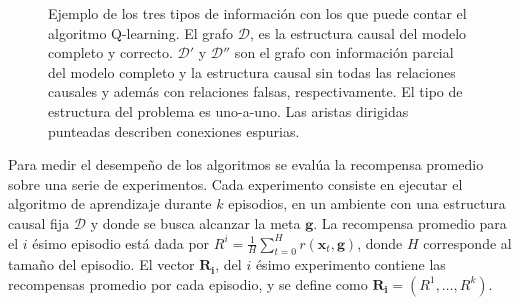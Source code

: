 \begin{figure}
  \centering
  \qquad
    \qquad
  \caption{Ejemplo de los tres tipos de información con los que puede contar el algoritmo Q-learning. El grafo $\mathcal{D}$, es la estructura causal del modelo completo y correcto. $\mathcal{D'}$ y $\mathcal{D''}$ son el grafo con información parcial del modelo completo y la estructura causal sin todas las relaciones causales y además con relaciones falsas, respectivamente. El tipo de estructura
  del problema es uno-a-uno. Las aristas dirigidas punteadas describen conexiones espurias.}
  \label{fig:types-info-dag}
\end{figure}

Para medir el desempeño de los algoritmos se evalúa la recompensa
promedio sobre una serie de experimentos.
Cada experimento consiste en ejecutar el algoritmo de aprendizaje durante $k$ episodios, en 
un ambiente con una estructura causal fija $\mathcal{D}$ y donde se busca alcanzar la meta $\mathbf{g}$.
La recompensa promedio para el $i$ ésimo episodio está dada por
$R^{i} = \frac{1}{H}\sum_{t=0}^H r(\mathbf{x}_t, \mathbf{g})$,
donde $H$ corresponde al tamaño del episodio.
El vector $\mathbf{R_i}$, del $i$ ésimo experimento contiene las recompensas promedio por cada episodio, y se define como
$\mathbf{R_i} = (R^{1}, \dots, R^k)$.

